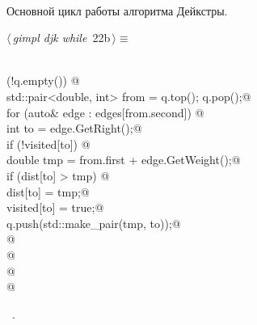 \documentclass[12pt]{article}
\begin{document}
\paragraph{}
Основной цикл работы алгоритма Дейкстры.
\begin{flushleft} \small
\begin{minipage}{\linewidth}\label{scrap40}\raggedright\small
{} $\langle\,${\itshape gimpl djk while}\nobreak\ {\footnotesize {22b}}$\,\rangle\equiv$
\vspace{-1ex}
\begin{list}{}{} \item
\mbox{}\verb@@\\
\mbox{}\verb@while (!q.empty()) {@\\
\mbox{}\verb@        std::pair<double, int> from = q.top(); q.pop();@\\
\mbox{}\verb@        for (auto& edge : edges[from.second]) {@\\
\mbox{}\verb@            int to = edge.GetRight();@\\
\mbox{}\verb@            if (!visited[to]) {@\\
\mbox{}\verb@                double tmp = from.first + edge.GetWeight();@\\
\mbox{}\verb@                if (dist[to] > tmp) {@\\
\mbox{}\verb@                    dist[to] = tmp;@\\
\mbox{}\verb@                    visited[to] = true;@\\
\mbox{}\verb@                    q.push(std::make_pair(tmp, to));@\\
\mbox{}\verb@                }@\\
\mbox{}\verb@            }@\\
\mbox{}\verb@        }@\\
\mbox{}\verb@    } @\\
\mbox{}\verb@@{\NWsep}
\end{list}
\vspace{-1.5ex}
\footnotesize
\begin{list}{}{\setlength{\itemsep}{-\parsep}\setlength{\itemindent}{-\leftmargin}}
\item \NWtxtMacroRefIn\ .

\item{}
\end{list}
\end{minipage}\vspace{4ex}
\end{flushleft}
\end{document}
